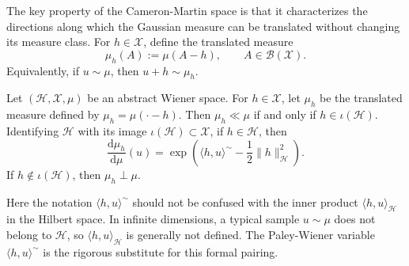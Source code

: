 \documentclass[11pt]{article}
\renewcommand{\d}{\mathrm{d}}
\begin{document}
The key property of the Cameron-Martin space is that it characterizes the directions along which the Gaussian measure can be translated without changing its measure class. For $h\in\mathcal X$, define the translated measure
\[
    \mu_h(A)
    :=
    \mu(A-h),
    \qquad A\in\mathcal B(\mathcal X).
\]
Equivalently, if $u\sim\mu$, then $u+h\sim\mu_h$.

\begin{theorem}
\label{thm:cameron_martin}
Let $(\mathcal H,\mathcal X,\mu)$ be an abstract Wiener space. For $h\in\mathcal X$, let $\mu_h$ be the translated measure defined by $\mu_h=\mu(\cdot-h)$.
Then $\mu_h\ll\mu$ if and only if $h\in\iota(\mathcal H)$. Identifying $\mathcal H$ with its image $\iota(\mathcal H)\subset\mathcal X$, if $h\in\mathcal H$, then
\[
    \frac{\d\mu_h}{\d\mu}(u)
    =
    \exp\left(
        \langle h,u\rangle^\sim
        -
        \frac12\|h\|_{\mathcal H}^2
    \right).
\]
If $h\notin\iota(\mathcal H)$, then $\mu_h\perp\mu$.
\end{theorem}

Here the notation $\langle h,u\rangle^\sim$ should not be confused with the inner product $\langle h,u\rangle_{\mathcal H}$ in the Hilbert space. In infinite dimensions, a typical sample $u\sim\mu$ does not belong to $\mathcal H$, so $\langle h,u\rangle_{\mathcal H}$ is generally not defined. The Paley-Wiener variable $\langle h,u\rangle^\sim$ is the rigorous substitute for this formal pairing.
\end{document}
